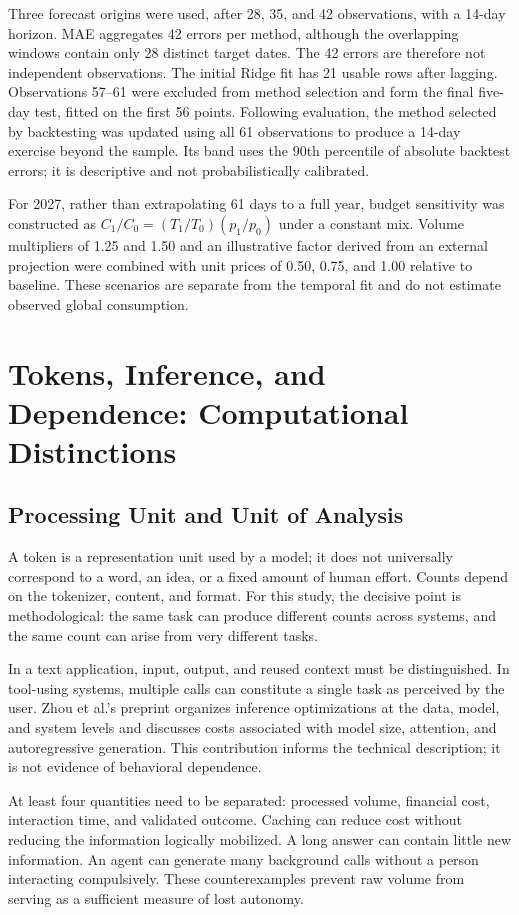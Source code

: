 \documentclass[11pt,a4paper]{article}
\begin{document}
Three forecast origins were used, after 28, 35, and 42 observations, with a 14-day horizon. MAE aggregates 42 errors per method, although the overlapping windows contain only 28 distinct target dates. The 42 errors are therefore not independent observations. The initial Ridge fit has 21 usable rows after lagging. Observations 57--61 were excluded from method selection and form the final five-day test, fitted on the first 56 points. Following evaluation, the method selected by backtesting was updated using all 61 observations to produce a 14-day exercise beyond the sample. Its band uses the 90th percentile of absolute backtest errors; it is descriptive and not probabilistically calibrated.

For 2027, rather than extrapolating 61 days to a full year, budget sensitivity was constructed as $C_1/C_0=(T_1/T_0)(p_1/p_0)$ under a constant mix. Volume multipliers of 1.25 and 1.50 and an illustrative factor derived from an external projection were combined with unit prices of 0.50, 0.75, and 1.00 relative to baseline. These scenarios are separate from the temporal fit and do not estimate observed global consumption.

\section{Tokens, Inference, and Dependence: Computational Distinctions}
\subsection{Processing Unit and Unit of Analysis}
A token is a representation unit used by a model; it does not universally correspond to a word, an idea, or a fixed amount of human effort. Counts depend on the tokenizer, content, and format. For this study, the decisive point is methodological: the same task can produce different counts across systems, and the same count can arise from very different tasks.

In a text application, input, output, and reused context must be distinguished. In tool-using systems, multiple calls can constitute a single task as perceived by the user. Zhou et al.'s preprint \cite{zhou} organizes inference optimizations at the data, model, and system levels and discusses costs associated with model size, attention, and autoregressive generation. This contribution informs the technical description; it is not evidence of behavioral dependence.

At least four quantities need to be separated: processed volume, financial cost, interaction time, and validated outcome. Caching can reduce cost without reducing the information logically mobilized. A long answer can contain little new information. An agent can generate many background calls without a person interacting compulsively. These counterexamples prevent raw volume from serving as a sufficient measure of lost autonomy.
\end{document}

